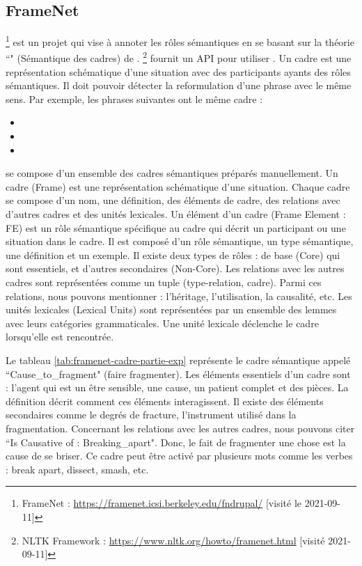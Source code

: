 \documentclass{KodeBook}
\begin{document}
\subsection{FrameNet}

\footnote{FrameNet : \url{https://framenet.icsi.berkeley.edu/fndrupal/} [visité le 2021-09-11]} est un projet qui vise à annoter les rôles sémantiques en se basant sur la théorie ``" (Sémantique des cadres) de . 
\footnote{NLTK Framework : \url{https://www.nltk.org/howto/framenet.html} [visité 2021-09-11]} fournit un API pour utiliser . 
Un cadre est une représentation schématique d'une situation avec des participants ayants des rôles sémantiques.
Il doit pouvoir détecter la reformulation d'une phrase avec le même sens. 
Par exemple, les phrases suivantes ont le même cadre :
\begin{itemize}
	\item {}
	\item {}
	\item {}
\end{itemize}


 se compose d'un ensemble des cadres sémantiques préparés manuellement. 
Un cadre (Frame) est une représentation schématique d'une situation.
Chaque cadre se compose d'un nom, une définition, des éléments de cadre, des  relations avec d'autres cadres et des unités lexicales. 
Un élément d'un cadre (Frame Element : FE) est un rôle sémantique spécifique au cadre qui décrit un participant ou une situation dans le cadre. 
Il est composé d'un rôle sémantique, un type sémantique, une définition et un exemple. 
Il existe deux types de rôles : de base (Core) qui sont essentiels, et d'autres secondaires (Non-Core).
Les relations avec les autres cadres sont représentées comme un tuple (type-relation, cadre). 
Parmi ces relations, nous pouvons mentionner : l'héritage, l'utilisation, la causalité, etc. 
Les unités lexicales (Lexical Units) sont représentées par un ensemble des lemmes avec leurs catégories grammaticales.
Une unité lexicale déclenche le cadre lorsqu'elle est rencontrée.

Le tableau \ref{tab:framenet-cadre-partie-exp} représente le cadre sémantique appelé ``Cause\_to\_fragment" (faire fragmenter). 
Les éléments essentiels d'un cadre sont : l'agent qui est un être sensible, une cause, un patient complet et des pièces. 
La définition décrit comment ces éléments interagissent.
Il existe des éléments secondaires comme le degrés de fracture, l'instrument utilisé dans la fragmentation. 
Concernant les relations avec les autres cadres, nous pouvons citer ``Is Causative of : Breaking\_apart". 
Donc, le fait de fragmenter une chose est la cause de se briser. 
Ce cadre peut être activé par plusieurs mots comme les verbes : break apart, dissect, smash, etc.
\end{document}
